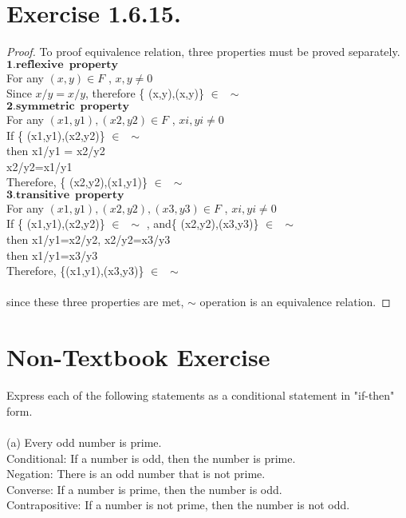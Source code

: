 \documentclass[12pt]{article}
\theoremstyle{definition}
\numberwithin{equation}{subsection}
\begin{document}
\section{Exercise 1.6.15.}
\begin{proof}
To proof equivalence relation, three properties must be proved separately.
\\$\boldsymbol{ 1. reflexive \enspace property}$
\\ For any $(x,y) \in F$ , $x,y \neq 0$
\\ Since $x/y=x/y$,
therefore \{ (x,y),(x,y)\} $\in \enspace \sim$ 
\\  $\boldsymbol{ 2. symmetric \enspace property}$
\\  For any $(x1,y1), (x2,y2) \in F$ , $xi,yi \neq 0$
\\If \{ (x1,y1),(x2,y2)\} $\in \enspace \sim$ 
\\ then x1/y1 = x2/y2
\\ x2/y2=x1/y1 
\\Therefore, \{ (x2,y2),(x1,y1)\} $\in \enspace \sim$ 
\\  $\boldsymbol{ 3. transitive \enspace property}$
\\  For any $(x1,y1), (x2,y2),(x3,y3) \in F$ , $xi,yi \neq 0$
\\If \{ (x1,y1),(x2,y2)\} $\in \enspace \sim$ ,
 and\{ (x2,y2),(x3,y3)\} $\in \enspace \sim$ 
 \\then x1/y1=x2/y2, x2/y2=x3/y3
 \\then x1/y1=x3/y3
 \\Therefore, \{(x1,y1),(x3,y3)\} $\in \enspace \sim$ 
 \\
 \\since these three properties are met, $\sim $ operation is an equivalence relation. 

\end{proof}

\section{Non-Textbook Exercise}

Express each of the following statements as a conditional statement in "if-then" form. \\ \\

(a) Every odd number is prime.
\\Conditional: If a number is odd, then the number is prime.
\\Negation: There is an odd number that is not prime.
\\Converse: If a number is prime, then the number is odd.
\\Contrapositive: If a number is not prime, then the number is not odd. \\ \\
\end{document}
